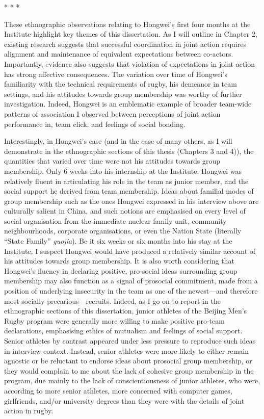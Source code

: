 \begin{center}
  * * *
\end{center}

These ethnographic observations relating to Hongwei's first four months at the Institute highlight key themes of this dissertation.  As I will outline in Chapter 2, existing research suggests that successful coordination in joint action requires alignment and maintenance of equivalent expectations between co-actors.  Importantly, evidence also suggests that violation of expectations in joint action has strong affective consequences.  The variation over time of Hongwei's familiarity with the technical requirements of rugby, his demeanor in team settings, and his attitudes towards group membership was worthy of further investigation.  Indeed, Hongwei is an emblematic example of broader team-wide patterns of association I observed between perceptions of joint action performance in, team click, and feelings of social bonding.

Interestingly, in Hongwei's case (and in the case of many others, as I will demonstrate in the ethnographic sections of this thesis (Chapters 3 and 4)), the quantities that varied over time were not his attitudes towards group membership.  Only 6 weeks into his internship at the Institute, Hongwei was relatively fluent in articulating his role in the team as junior member, and the social support he derived from team membership.  Ideas about familial modes of group membership such as the ones Hongwei expressed in his interview above are culturally salient in China, and such notions are emphasised on every level of social organisation from the immediate nuclear family unit, community neighbourhoods, corporate organisations, or even the Nation State (literally ``State Family'' \textit{guojia}). Be it six weeks or six months into his stay at the Institute, I suspect Hongwei would have produced a relatively similar account of his attitudes towards group membership.  It is also worth considering that Hongwei's fluency in declaring positive, pro-social ideas surrounding group membership may also function as a  signal of prosocial commitment, made from a position of underlying insecurity in the team as one of the newest---and therefore most socially precarious---recruits.  Indeed, as I go on to report in the ethnographic sections of this dissertation, junior athletes of the Beijing Men's Rugby program were generally more willing to make positive pro-team declarations, emphasising ethics of mutualism and feelings of social support. Senior athletes by contrast appeared under less pressure to reproduce such ideas in interview context. Instead, senior athletes were more likely to either remain agnostic or be reluctant to endorse ideas about prosocial group membership, or they would complain to me about the lack of cohesive group membership in the program, due mainly to the lack of conscientiousness of junior athletes, who were, according to more senior athletes, more concerned with computer games, girlfriends, and/or university degrees than they were with the details of joint action in rugby.


